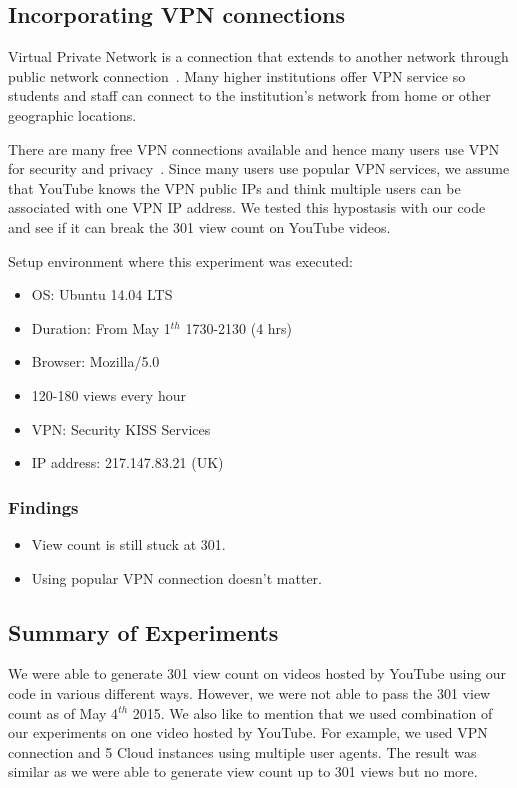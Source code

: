 \documentclass[conference]{IEEEtran}
\begin{document}
\subsection{Incorporating VPN connections}

Virtual Private Network is a connection that extends to another network through public network connection~\cite{c23}. Many higher institutions offer VPN service so students and staff can connect to the institution’s network from home or other geographic locations.

There are many free VPN connections available and hence many users use VPN for security and privacy~\cite{c24}. Since many users use popular VPN services, we assume that YouTube knows the VPN public IPs and think multiple users can be associated with one VPN IP address. We tested this hypostasis with our code and see if it can break the 301 view count on YouTube videos.

Setup environment where this experiment was executed:
\begin{itemize}
  \setlength\itemsep{-0.1em}
  \item OS: Ubuntu 14.04 LTS
  \item Duration: From May 1$^{th}$ 1730-2130 (4 hrs)
  \item Browser: Mozilla/5.0
  \item 120-180 views every hour
  \item VPN: Security KISS Services
  \item IP address: 217.147.83.21 (UK)
\end{itemize}

\subsubsection*{Findings}
\begin{itemize}
  \setlength\itemsep{-0.1em}
  \item View count is still stuck at 301.
  \item Using popular VPN connection doesn’t matter.
\end{itemize}

\subsection{Summary of Experiments}

We were able to generate 301 view count on videos hosted by YouTube using our code in various different ways. However, we were not able to pass the 301 view count as of May 4$^{th}$ 2015. We also like to mention that we used combination of our experiments on one video hosted by YouTube. For example, we used VPN connection and 5 Cloud instances using multiple user agents. The result was similar as we were able to generate view count up to 301 views but no more.
\end{document}
